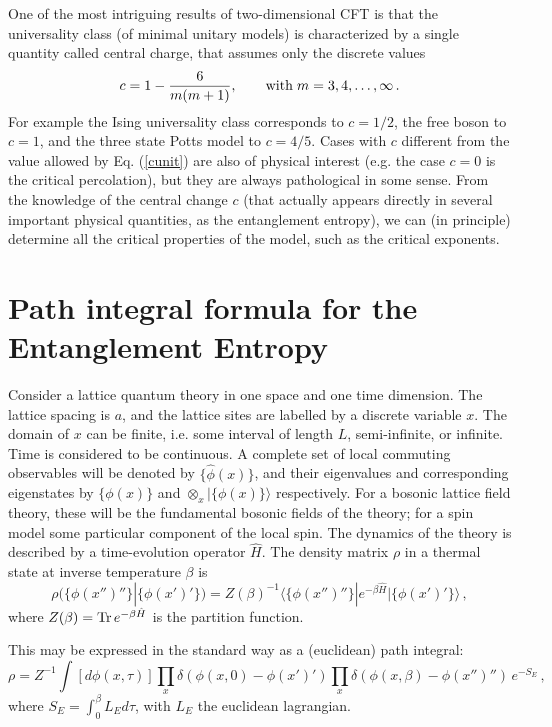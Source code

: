 \documentclass{ws-ijqi}
\def\be{\begin{equation}}
\def\ee{\end{equation}}
\begin{document}
One of the most intriguing results\cite{confbook} of two-dimensional CFT is 
that the universality class (of minimal unitary models) 
is characterized by a single quantity called 
central charge, that assumes only the discrete values
\be
c=1-\frac{6}{m(m+1)}, \qquad {\rm with} \; m=3,4,\dots,\infty\,.
\label{cunit}
\ee
For example the Ising universality class corresponds to $c=1/2$, the 
free boson to $c=1$, and the three state Potts model to $c=4/5$.
Cases with $c$ different from the value allowed by Eq. (\ref{cunit})
are also of physical interest (e.g. the case $c=0$ is the critical 
percolation), but they are always pathological in some sense.
From the knowledge of the central change $c$ (that actually appears directly 
in several important physical quantities, as the entanglement 
entropy\cite{Holzhey}), we 
can (in principle) determine all the critical properties of the model, such as
the critical exponents.







\section{Path integral formula for the Entanglement Entropy}
\label{pathsec}

Consider a lattice quantum theory in one space and one time
dimension. The lattice spacing is $a$,
and the lattice sites are labelled by a discrete variable $x$. 
The domain of $x$ can be finite, i.e. some interval of length $L$, 
semi-infinite, or infinite. Time is considered to be continuous. 
A complete set of local
commuting observables will be denoted by $\{\hat\phi(x)\}$, and their
eigenvalues and corresponding eigenstates by $\{\phi(x)\}$ and
$\otimes_x|\{\phi(x)\}\rangle$ respectively. For a bosonic lattice
field theory,
these will be the fundamental bosonic fields of the theory; for a spin
model some particular component of the local spin. The dynamics of the
theory is described by a time-evolution operator $\hat H$. The density
matrix $\rho$ in a thermal state at inverse temperature $\beta$
is 
\begin{equation}
\rho(\{\phi(x'')''\}|\{\phi(x')'\})=
Z(\beta)^{-1}\langle\{\phi(x'')''\}|e^{-\beta\hat
H}|\{\phi(x')'\}\rangle\,,
\end{equation}
where $Z(\beta)={\rm Tr}\,e^{-\beta\hat H}$ is the partition function.

This may be expressed in the standard way
as a (euclidean) path integral:
\begin{equation}
\label{pathi}
\rho=Z^{-1}\int[d\phi(x,\tau)]
\prod_x\delta(\phi(x,0)-\phi(x')')\prod_x
\delta(\phi(x,\beta)-\phi(x'')'')\,e^{-S_E}\,,
\end{equation}
where $S_E=\int_0^\beta L_Ed\tau$, with $L_E$ the euclidean lagrangian. 
\end{document}
